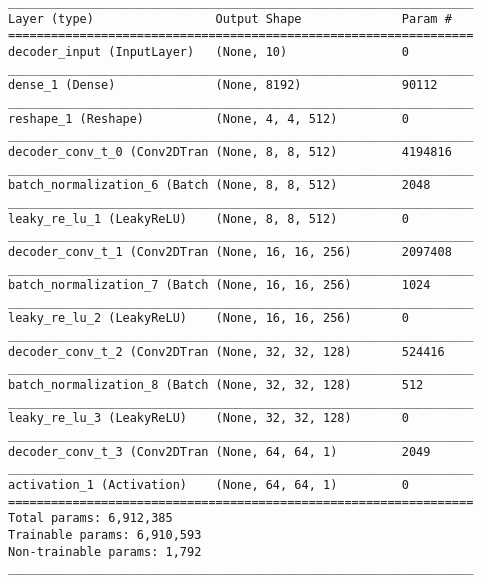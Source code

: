 \begin{lstlisting}[caption={(dSprites, 7,500, 6,250, 5,000, 3,750)-\ac{VAE} Decoder},captionpos=b,basicstyle=\tiny, label={lst:dsprites-vae-decoder}]
_________________________________________________________________
Layer (type)                 Output Shape              Param #
=================================================================
decoder_input (InputLayer)   (None, 10)                0
_________________________________________________________________
dense_1 (Dense)              (None, 8192)              90112
_________________________________________________________________
reshape_1 (Reshape)          (None, 4, 4, 512)         0
_________________________________________________________________
decoder_conv_t_0 (Conv2DTran (None, 8, 8, 512)         4194816
_________________________________________________________________
batch_normalization_6 (Batch (None, 8, 8, 512)         2048
_________________________________________________________________
leaky_re_lu_1 (LeakyReLU)    (None, 8, 8, 512)         0
_________________________________________________________________
decoder_conv_t_1 (Conv2DTran (None, 16, 16, 256)       2097408
_________________________________________________________________
batch_normalization_7 (Batch (None, 16, 16, 256)       1024
_________________________________________________________________
leaky_re_lu_2 (LeakyReLU)    (None, 16, 16, 256)       0
_________________________________________________________________
decoder_conv_t_2 (Conv2DTran (None, 32, 32, 128)       524416
_________________________________________________________________
batch_normalization_8 (Batch (None, 32, 32, 128)       512
_________________________________________________________________
leaky_re_lu_3 (LeakyReLU)    (None, 32, 32, 128)       0
_________________________________________________________________
decoder_conv_t_3 (Conv2DTran (None, 64, 64, 1)         2049
_________________________________________________________________
activation_1 (Activation)    (None, 64, 64, 1)         0
=================================================================
Total params: 6,912,385
Trainable params: 6,910,593
Non-trainable params: 1,792
_________________________________________________________________
\end{lstlisting}
